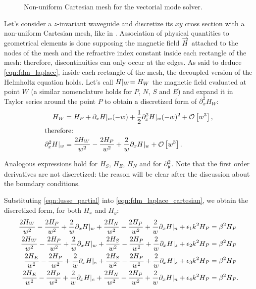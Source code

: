 \begin{figure}[htbp]
  \begin{center}
    \resizebox{6cm}{!}{}
  \end{center}
  \caption{Non-uniform Cartesian mesh for the vectorial mode solver.}
  \label{fig:lusse_fig2}
\end{figure}

Let's consider a $z$-invariant waveguide and discretize its $xy$ cross
section with a non-uniform Cartesian mesh, like in
. Association of physical quantities to
geometrical elements is done supposing the magnetic field $\overrightarrow{H}$
attached to the nodes of the mesh and the refractive index constant
inside each rectangle of the mesh: therefore, discontinuities can only
occur at the edges. As said to deduce \eqref{eqn:fdm_laplace}, inside
each rectangle of the mesh, the decoupled version of the Helmholtz
equation holds. Let's call $H\lvert_{W} = H_W$ the magnetic field
evaluated at point $W$ (a similar nomenclature holds for $P$, $N$, $S$
and $E$) and expand it in Taylor series around the point
$P$ to obtain a discretized form of $\partial_x^2 H_W$:
\begin{align}
  H_W & = H_P + \partial_x H|_w (-w) + \frac{1}{2} \partial_x^2 H|_w (-w)^2 + \mathcal{O}\left[w^3\right], \notag \\
\intertext{therefore:}
  \partial_x^2 H|_w & = \frac{2 H_W}{w^2} - \frac{2 H_P}{w^2} + \frac{2}{w} \partial_x H|_w + \mathcal{O}\left[w^3\right]. \label{eqn:lusse_partial}
\end{align}

Analogous expressions hold for $H_S$, $H_E$, $H_N$ and for
$\partial_y^2$. Note that the first order derivatives are not discretized:
the reason will be clear after the discussion about the boundary
conditions.

Substituting \eqref{eqn:lusse_partial} into
\eqref{eqn:fdm_laplace_cartesian}, we obtain the discretized form,
for both $H_x$ and $H_y$:
\begin{equation} \label{eqn:lusse_helmholtz} \begin{aligned}
  \frac{2 H_W}{w^2} - \frac{2 H_P}{w^2} + \frac{2}{w} \partial_x H|_w +
  \frac{2 H_N}{w^2} - \frac{2 H_P}{w^2} + \frac{2}{w} \partial_x H|_n +
  \epsilon_1 k^2 H_P & = \beta^2 H_P \\
  \frac{2 H_W}{w^2} - \frac{2 H_P}{w^2} + \frac{2}{w} \partial_x H|_w +
  \frac{2 H_S}{w^2} - \frac{2 H_P}{w^2} + \frac{2}{w} \partial_x H|_s +
  \epsilon_2 k^2 H_P & = \beta^2 H_P \\
  \frac{2 H_E}{w^2} - \frac{2 H_P}{w^2} + \frac{2}{w} \partial_x H|_e +
  \frac{2 H_S}{w^2} - \frac{2 H_P}{w^2} + \frac{2}{w} \partial_x H|_s +
  \epsilon_3 k^2 H_P & = \beta^2 H_P \\
  \frac{2 H_E}{w^2} - \frac{2 H_P}{w^2} + \frac{2}{w} \partial_x H|_e +
  \frac{2 H_N}{w^2} - \frac{2 H_P}{w^2} + \frac{2}{w} \partial_x H|_n +
  \epsilon_4 k^2 H_P & = \beta^2 H_P.
\end{aligned} \end{equation}

